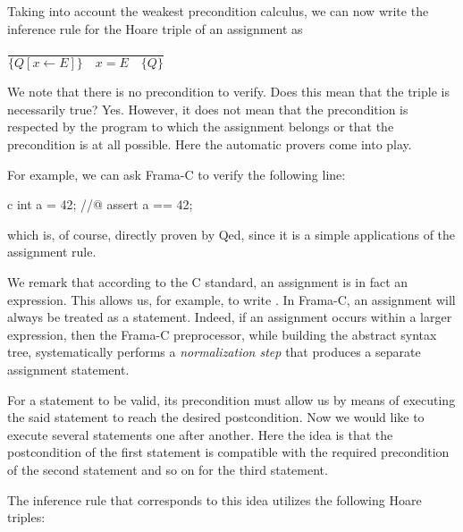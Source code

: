 \documentclass[middle]{zmdocument}
\begin{document}
Taking into account the weakest precondition calculus, we can now write
the inference rule for the Hoare triple of an assignment as



\begin{center}
$\dfrac{}{\{Q[x \leftarrow E] \}\quad x = E \quad\{ Q \}}$


\end{center}


We note that there is no precondition to verify. Does this mean that the
triple is necessarily true? Yes. However, it does not mean that the
precondition is respected by the program to which the assignment belongs
or that the precondition is at all possible. Here the automatic provers
come into play.



For example, we can ask Frama-C to verify the following line:



\begin{CodeBlock}{c}
int a = 42;
//@ assert a == 42;
\end{CodeBlock}



which is, of course, directly proven by Qed, since it is a simple
applications of the assignment rule.



\begin{Information}
  We remark that according to the C standard, an assignment is in fact an
  expression. This allows us, for example, to write
  .
  In Frama-C, an assignment will always be treated as a statement. Indeed,
  if an assignment occurs within a larger expression, then the Frama-C
  preprocessor, while building the abstract syntax tree, systematically
  performs a \emph{normalization step} that produces a separate assignment
  statement.
\end{Information}



For a statement to be valid, its precondition must allow us by means of
executing the said statement to reach the desired postcondition. Now we
would like to execute several statements one after another. Here the
idea is that the postcondition of the first statement is compatible with
the required precondition of the second statement and so on for the
third statement.



The inference rule that corresponds to this idea utilizes the following
Hoare triples:
\end{document}
